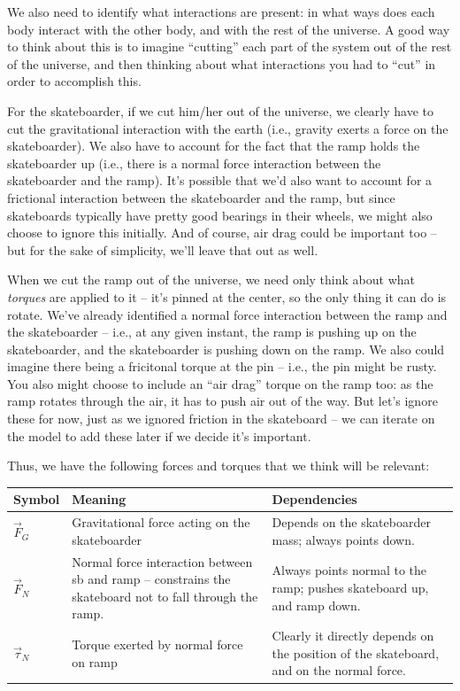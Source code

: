 We also need to identify what interactions are present:  in what ways does each body interact with the other body, and with the rest of the universe.  A good way to think about this is to imagine ``cutting'' each part of the system out of the rest of the universe, and then thinking about what interactions you had to ``cut'' in order to accomplish this.

For the skateboarder, if we cut him/her out of the universe, we clearly have to cut the gravitational interaction with the earth (i.e., gravity exerts a force on the skateboarder).  We also have to account for the fact that the ramp holds the skateboarder up (i.e., there is a normal force interaction between the skateboarder and the ramp).  It's possible that we'd also want to account for a frictional interaction between the skateboarder and the ramp, but since skateboards typically have pretty good bearings in their wheels, we might also choose to ignore this initially.  And of course, air drag could be important too -- but for the sake of simplicity, we'll leave that out as well.

When we cut the ramp out of the universe, we need only think about what {\it torques} are applied to it -- it's pinned at the center, so the only thing it can do is rotate.  We've already identified a normal force interaction between the ramp and the skateboarder -- i.e., at any given instant, the ramp is pushing up on the skateboarder, and the skateboarder is pushing down on the ramp.  We also could imagine there being a fricitonal torque at the pin -- i.e., the pin might be rusty.  You also might choose to include an ``air drag'' torque on the ramp too: as the ramp rotates through the air, it has to push air out of the way.  But let's ignore these for now, just as we ignored friction in the skateboard -- we can iterate on the model to add these later if we decide it's important.

Thus, we have the following forces and torques that we think will be relevant:

\begin{center}
\begin{tabular}{ p{3cm} | p{5cm} | p{5cm}}
Symbol & Meaning & Dependencies \\
\hline
\hline
$\vec{F}_G$ & Gravitational force acting on the skateboarder & Depends on the skateboarder mass; always points down.\\
\hline
$\vec{F}_N$ & Normal force interaction between sb and ramp -- constrains the skateboard not to fall through the ramp. & Always points normal to the ramp; pushes skateboard up, and ramp down.\\ 
\hline
$\vec{\tau}_N$& Torque exerted by normal force on ramp &  Clearly it directly depends on the position of the skateboard, and on the normal force. \\

\end{tabular}
\end{center}

